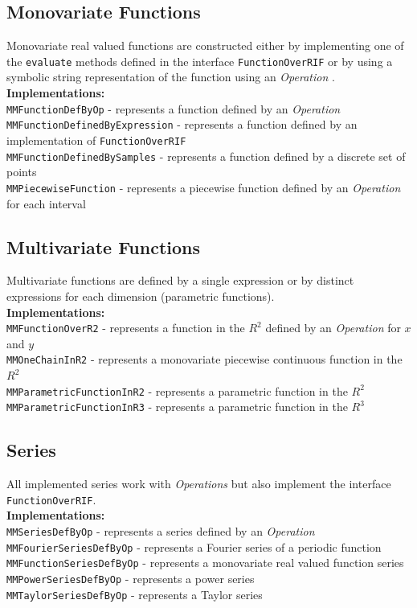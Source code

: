 \documentclass[a4paper,12pt]{book}
\newcommand{\op}{\emph{Operation }}
\newcommand{\ops}{\emph{Operations }}
\begin{document}
\begin{appendix}
    \subsection{Monovariate Functions}
      Monovariate real valued functions are constructed either by implementing one of the \verb|evaluate| methods
      defined in the interface \verb|FunctionOverRIF| or by using a symbolic string representation of
      the function using an \op.\\
      {\bf Implementations:}\\
        \verb|MMFunctionDefByOp| - represents a function defined by an \op\\
        \verb|MMFunctionDefinedByExpression| - represents a function defined by an implementation of \verb|FunctionOverRIF|\\
        \verb|MMFunctionDefinedBySamples| - represents a function defined by a discrete set of points\\
        \verb|MMPiecewiseFunction| - represents a piecewise function defined by an \op for each interval
      
    \subsection{Multivariate Functions}
      Multivariate functions are defined by a single expression or by distinct expressions for each dimension
      (parametric functions).\\
      {\bf Implementations:}\\
        \verb|MMFunctionOverR2| - represents a function in the $R^2$ defined by an \op for $x$ and $y$\\
        \verb|MMOneChainInR2| - represents a monovariate piecewise continuous function in the $R^2$\\
        \verb|MMParametricFunctionInR2| - represents a parametric function in the $R^2$\\
        \verb|MMParametricFunctionInR3| - represents a parametric function in the $R^3$
      
    \subsection{Series}
    All implemented series work with \ops but also implement the interface \verb|FunctionOverRIF|.\\
      {\bf Implementations:}\\
        \verb|MMSeriesDefByOp| - represents a series defined by an \op\\
        \verb|MMFourierSeriesDefByOp| - represents a Fourier series of a periodic function\\
        \verb|MMFunctionSeriesDefByOp| - represents a monovariate real valued function series\\
        \verb|MMPowerSeriesDefByOp| - represents a power series\\
        \verb|MMTaylorSeriesDefByOp| - represents a Taylor series
        

\end{appendix}
\end{document}
